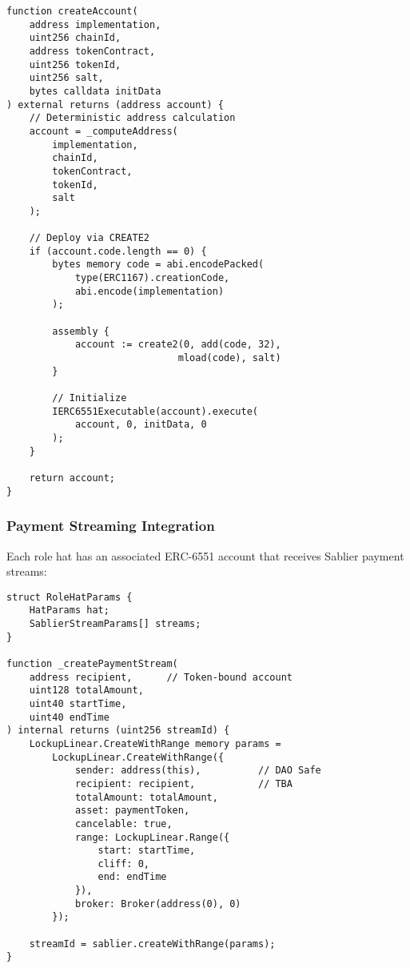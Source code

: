 \documentclass[11pt,a4paper]{article}
\begin{document}
\begin{lstlisting}[caption=Token-Bound Account Creation]
function createAccount(
    address implementation,
    uint256 chainId,
    address tokenContract,
    uint256 tokenId,
    uint256 salt,
    bytes calldata initData
) external returns (address account) {
    // Deterministic address calculation
    account = _computeAddress(
        implementation,
        chainId,
        tokenContract,
        tokenId,
        salt
    );

    // Deploy via CREATE2
    if (account.code.length == 0) {
        bytes memory code = abi.encodePacked(
            type(ERC1167).creationCode,
            abi.encode(implementation)
        );

        assembly {
            account := create2(0, add(code, 32),
                              mload(code), salt)
        }

        // Initialize
        IERC6551Executable(account).execute(
            account, 0, initData, 0
        );
    }

    return account;
}
\end{lstlisting}

\subsubsection{Payment Streaming Integration}

Each role hat has an associated ERC-6551 account that receives Sablier payment streams:

\begin{lstlisting}[caption=Role with Payment Stream]
struct RoleHatParams {
    HatParams hat;
    SablierStreamParams[] streams;
}

function _createPaymentStream(
    address recipient,      // Token-bound account
    uint128 totalAmount,
    uint40 startTime,
    uint40 endTime
) internal returns (uint256 streamId) {
    LockupLinear.CreateWithRange memory params =
        LockupLinear.CreateWithRange({
            sender: address(this),          // DAO Safe
            recipient: recipient,           // TBA
            totalAmount: totalAmount,
            asset: paymentToken,
            cancelable: true,
            range: LockupLinear.Range({
                start: startTime,
                cliff: 0,
                end: endTime
            }),
            broker: Broker(address(0), 0)
        });

    streamId = sablier.createWithRange(params);
}
\end{lstlisting}
\end{document}
